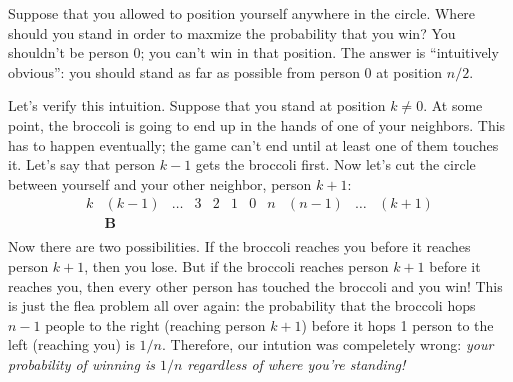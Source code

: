 Suppose that you allowed to position yourself anywhere in the circle.
Where should you stand in order to maxmize the probability that you
win?  You shouldn't be person 0; you can't win in that position.  The
answer is ``intuitively obvious'': you should stand as far as possible
from person 0 at position $n / 2$.

Let's verify this intuition.  Suppose that you stand at position $k
\neq 0$.  At some point, the broccoli is going to end up in the hands
of one of your neighbors.  This has to happen eventually; the game
can't end until at least one of them touches it.  Let's say that
person $k - 1$ gets the broccoli first.  Now let's cut the circle
between yourself and your other neighbor, person $k+1$:
%
\[
\begin{array}{cccccccccccccc}
k & (k-1) & \ldots & 3 & 2 & 1 & 0 & n & (n-1) & \ldots & (k+1) \\
  & \mathbf{B} \\
\end{array}
\]
%
Now there are two possibilities.  If the broccoli reaches you before
it reaches person $k+1$, then you lose.  But if the broccoli reaches
person $k+1$ before it reaches you, then every other person has
touched the broccoli and you win!  This is just the flea problem all
over again: the probability that the broccoli hops $n-1$ people to the
right (reaching person $k+1$) before it hops 1 person to the left
(reaching you) is $1 / n$.  Therefore, our intution was compeletely
wrong: \emph{your probability of winning is $1 / n$ regardless of
where you're standing!}


\endinput
